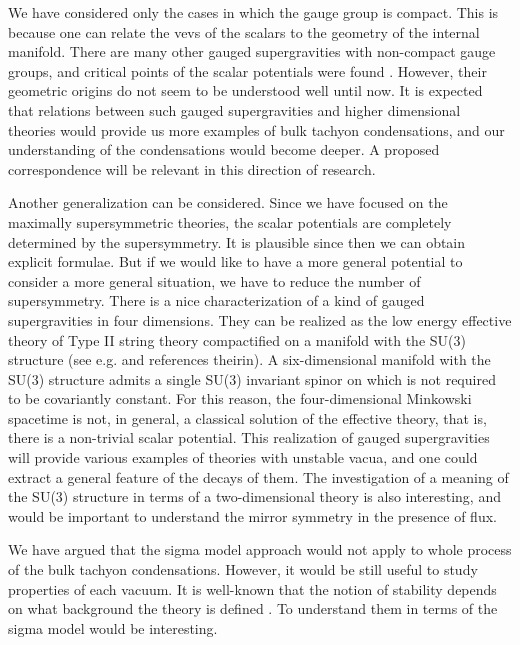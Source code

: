 \documentclass[a4paper,a4paper]{article}
\begin{document}
\vspace{3mm}

We have considered only the cases in which the gauge group is compact. 
This is because one can relate the vevs of the scalars to the geometry of the internal manifold. 
There are many other gauged supergravities with non-compact gauge groups, and critical points of the scalar 
potentials were found \cite{explicitP}\cite{5dim1}. 
However, their geometric origins do not seem to be understood well until now. 
It is expected that relations between such gauged supergravities and higher dimensional theories would provide us 
more examples of bulk tachyon condensations, and our understanding of the condensations would become deeper. 
A proposed correspondence \cite{DW/QFT} will be relevant in this direction of research. 

\vspace{3mm}

Another generalization can be considered. 
Since we have focused on the maximally supersymmetric theories, the scalar potentials are completely determined 
by the supersymmetry. 
It is plausible since then we can obtain explicit formulae. 
But if we would like to have a more general potential to consider a more general situation, we have to reduce 
the number of supersymmetry. 
There is a nice characterization of a kind of \coordHE{} gauged supergravities in four dimensions. 
They can be realized as the low energy effective theory of Type II string theory compactified on a manifold with 
the SU(3) structure (see e.g. \cite{SU(3)str} and references theirin). 
A six-dimensional manifold \coordHE{} with the SU(3) structure admits a single SU(3) invariant spinor on \coordHE{} which is 
not required to be covariantly constant. 
For this reason, the four-dimensional Minkowski spacetime 
is not, in general, a classical solution of the effective 
theory, that is, there is a non-trivial scalar potential. 
This realization of gauged supergravities will provide various examples of theories with unstable vacua, and 
one could extract a general feature of the decays of them. 
The investigation of a meaning of the SU(3) structure in terms of a two-dimensional theory is also interesting, 
and would be important to understand the mirror symmetry in the presence of flux. 

\vspace{3mm}

We have argued that the sigma model approach would not apply to whole process of the bulk tachyon condensations. 
However, it would be still useful to study properties of each vacuum. 
It is well-known that the notion of stability depends on what background the theory is defined \cite{BFbound}. 
To understand them in terms of the sigma model would be interesting. 
\end{document}
